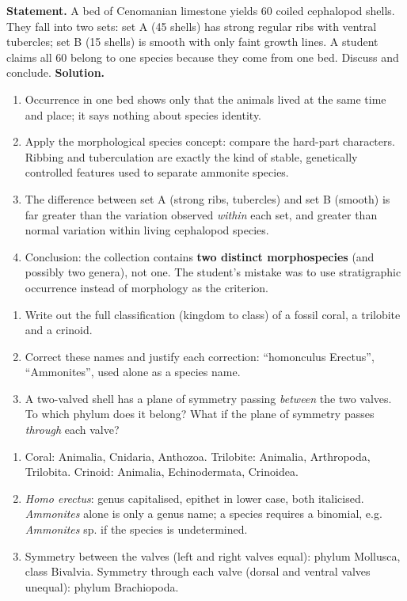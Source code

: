 \documentclass[11pt]{article}
\begin{document}
\begin{exoresolu}
\textbf{Statement.} A bed of Cenomanian limestone yields 60 coiled cephalopod shells. They fall into two sets: set A (45 shells) has strong regular ribs with ventral tubercles; set B (15 shells) is smooth with only faint growth lines. A student claims all 60 belong to one species because they come from one bed. Discuss and conclude.
\tcblower
\textbf{Solution.}
\begin{enumerate}
\item Occurrence in one bed shows only that the animals lived at the same time and place; it says nothing about species identity.
\item Apply the morphological species concept: compare the hard-part characters. Ribbing and tuberculation are exactly the kind of stable, genetically controlled features used to separate ammonite species.
\item The difference between set A (strong ribs, tubercles) and set B (smooth) is far greater than the variation observed \emph{within} each set, and greater than normal variation within living cephalopod species.
\item Conclusion: the collection contains \textbf{two distinct morphospecies} (and possibly two genera), not one. The student's mistake was to use stratigraphic occurrence instead of morphology as the criterion.
\end{enumerate}
\end{exoresolu}

\begin{exercice}
\begin{enumerate}
\item Write out the full classification (kingdom to class) of a fossil coral, a trilobite and a crinoid.
\item Correct these names and justify each correction: ``homonculus Erectus'', ``Ammonites'', used alone as a species name.
\item A two-valved shell has a plane of symmetry passing \emph{between} the two valves. To which phylum does it belong? What if the plane of symmetry passes \emph{through} each valve?
\end{enumerate}
\end{exercice}

\begin{corrige}[Exercise 1]
\begin{enumerate}
\item Coral: Animalia, Cnidaria, Anthozoa. Trilobite: Animalia, Arthropoda, Trilobita. Crinoid: Animalia, Echinodermata, Crinoidea.
\item \emph{Homo erectus}: genus capitalised, epithet in lower case, both italicised. \emph{Ammonites} alone is only a genus name; a species requires a binomial, e.g. \emph{Ammonites} sp. if the species is undetermined.
\item Symmetry between the valves (left and right valves equal): phylum Mollusca, class Bivalvia. Symmetry through each valve (dorsal and ventral valves unequal): phylum Brachiopoda.
\end{enumerate}
\end{corrige}
\end{document}
